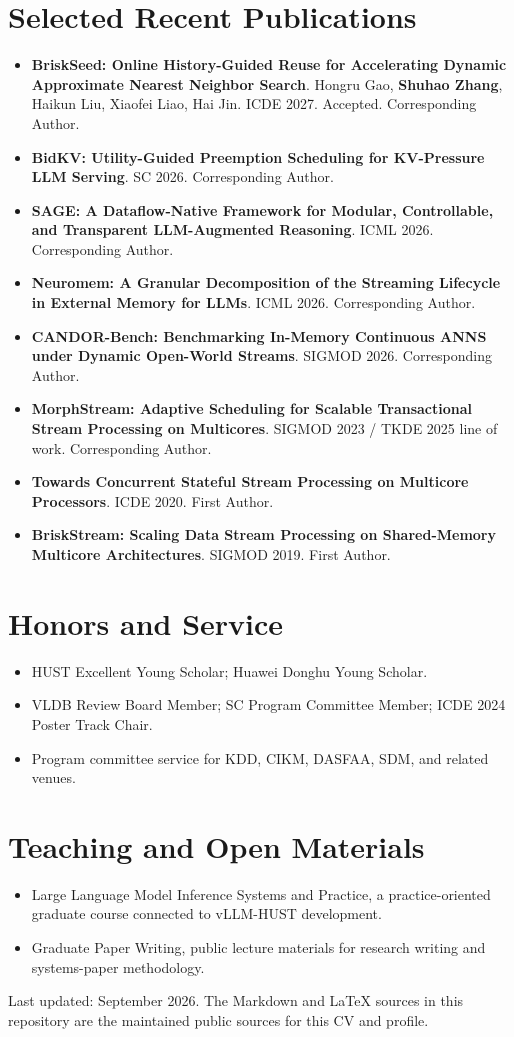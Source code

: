 \documentclass[10pt,a4paper]{article}
\newcommand{\cvsection}[1]{\section*{#1}}
\begin{document}
\cvsection{Selected Recent Publications}
\begin{itemize}
  \item \textbf{BriskSeed: Online History-Guided Reuse for Accelerating Dynamic Approximate Nearest Neighbor Search}. Hongru Gao, \textbf{Shuhao Zhang}, Haikun Liu, Xiaofei Liao, Hai Jin. ICDE 2027. Accepted. Corresponding Author.
  \item \textbf{BidKV: Utility-Guided Preemption Scheduling for KV-Pressure LLM Serving}. SC 2026. Corresponding Author.
  \item \textbf{SAGE: A Dataflow-Native Framework for Modular, Controllable, and Transparent LLM-Augmented Reasoning}. ICML 2026. Corresponding Author.
  \item \textbf{Neuromem: A Granular Decomposition of the Streaming Lifecycle in External Memory for LLMs}. ICML 2026. Corresponding Author.
  \item \textbf{CANDOR-Bench: Benchmarking In-Memory Continuous ANNS under Dynamic Open-World Streams}. SIGMOD 2026. Corresponding Author.
  \item \textbf{MorphStream: Adaptive Scheduling for Scalable Transactional Stream Processing on Multicores}. SIGMOD 2023 / TKDE 2025 line of work. Corresponding Author.
  \item \textbf{Towards Concurrent Stateful Stream Processing on Multicore Processors}. ICDE 2020. First Author.
  \item \textbf{BriskStream: Scaling Data Stream Processing on Shared-Memory Multicore Architectures}. SIGMOD 2019. First Author.
\end{itemize}

\cvsection{Honors and Service}
\begin{itemize}
  \item HUST Excellent Young Scholar; Huawei Donghu Young Scholar.
  \item VLDB Review Board Member; SC Program Committee Member; ICDE 2024 Poster Track Chair.
  \item Program committee service for KDD, CIKM, DASFAA, SDM, and related venues.
\end{itemize}

\cvsection{Teaching and Open Materials}
\begin{itemize}
  \item Large Language Model Inference Systems and Practice, a practice-oriented graduate course connected to vLLM-HUST development.
  \item Graduate Paper Writing, public lecture materials for research writing and systems-paper methodology.
\end{itemize}

\vfill
{\small\color{muted}Last updated: September 2026. The Markdown and LaTeX sources in this repository are the maintained public sources for this CV and profile.}
\end{document}
